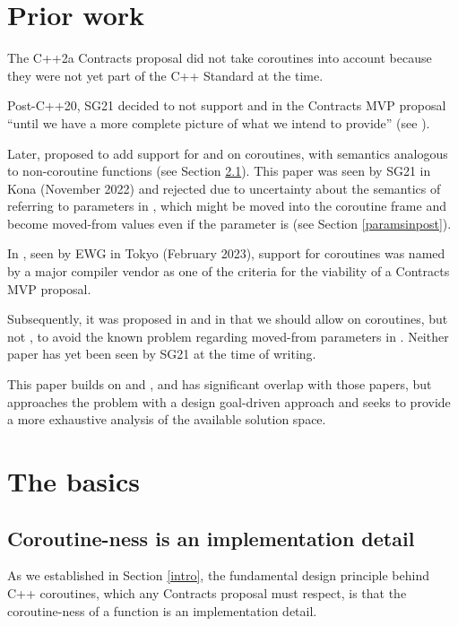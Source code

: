 \section{Prior work}

The C++2a Contracts proposal \cite{P0542R5} did not take coroutines into account because they were not yet part of the C++ Standard at the time.

Post-C++20, SG21 decided to not support  and  in the Contracts MVP proposal ``until we have a more complete picture of what we intend to provide'' (see \cite{P2932R3}).

Later, \cite{P2957R0} proposed to add support for  and  on coroutines, with semantics analogous to non-coroutine functions (see Section \ref{impldetail}). This paper was seen by SG21 in Kona (November 2022) and rejected due to uncertainty about the semantics of referring to parameters in , which might be moved into the coroutine frame and become moved-from values even if the parameter is  (see Section \ref{paramsinpost}).

In \cite{P3173R0}, seen by EWG in Tokyo (February 2023), support for coroutines was named by a major compiler vendor as one of the criteria for the viability of a Contracts MVP proposal.

Subsequently, it was proposed in \cite{P2957R1} and in \cite{P3251R0} that we should allow  on coroutines, but not , to avoid the known problem regarding moved-from parameters in . Neither paper has yet been seen by SG21 at the time of writing.

This paper builds on \cite{P2957R1} and \cite{P3251R0}, and has significant overlap with those papers, but approaches the problem with a design goal-driven approach and seeks to provide a more exhaustive analysis of the available solution space.

\section{The basics}

\subsection{Coroutine-ness is an implementation detail}
\label{impldetail}

As we established in Section \ref{intro}, the fundamental design principle behind C++ coroutines, which any Contracts proposal must respect, is that the coroutine-ness of a function  is an implementation detail.

